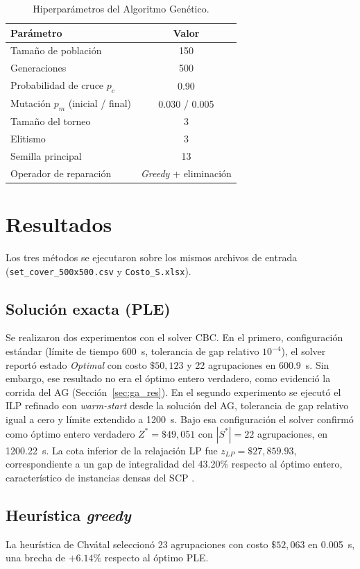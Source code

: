 \documentclass[conference]{IEEEtran}
\begin{document}
\begin{table}[htbp]
\caption{Hiperparámetros del Algoritmo Genético.}
\label{tab:hp}
\centering
\begin{tabular}{lc}
\toprule
\textbf{Parámetro} & \textbf{Valor} \\
\midrule
Tamaño de población & 150 \\
Generaciones & 500 \\
Probabilidad de cruce $p_c$ & 0.90 \\
Mutación $p_m$ (inicial / final) & 0.030 / 0.005 \\
Tamaño del torneo & 3 \\
Elitismo & 3 \\
Semilla principal & 13 \\
Operador de reparación & \textit{Greedy} + eliminación \\
\bottomrule
\end{tabular}
\end{table}

\section{Resultados}

Los tres métodos se ejecutaron sobre los mismos archivos de entrada (\texttt{set\_cover\_500x500.csv} y \texttt{Costo\_S.xlsx}).

\subsection{Solución exacta (PLE)}
Se realizaron dos experimentos con el solver CBC. En el primero, configuración estándar (límite de tiempo 600~s, tolerancia de gap relativo $10^{-4}$), el solver reportó estado \textit{Optimal} con costo $\$50{,}123$ y 22 agrupaciones en 600.9~s. Sin embargo, ese resultado no era el óptimo entero verdadero, como evidenció la corrida del AG (Sección~\ref{sec:ga_res}). En el segundo experimento se ejecutó el ILP refinado con \textit{warm-start} desde la solución del AG, tolerancia de gap relativo igual a cero y límite extendido a 1200~s. Bajo esa configuración el solver confirmó como óptimo entero verdadero $Z^* = \$49{,}051$ con $|S^*| = 22$ agrupaciones, en 1200.22~s. La cota inferior de la relajación LP fue $z_{LP} = \$27{,}859.93$, correspondiente a un gap de integralidad del 43.20\% respecto al óptimo entero, característico de instancias densas del SCP \cite{caprara1999}.

\subsection{Heurística \textit{greedy}}
La heurística de Chvátal seleccionó 23 agrupaciones con costo $\$52{,}063$ en 0.005~s, una brecha de $+6.14\%$ respecto al óptimo PLE.
\end{document}
